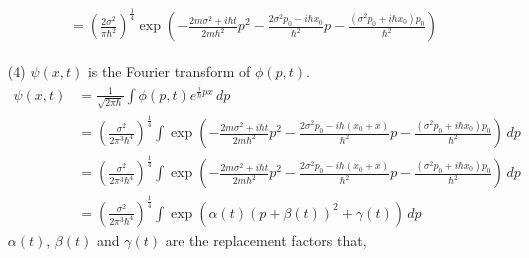 \documentclass[floatfix,nofootinbib,superscriptaddress,fleqn]{revtex4}
\begin{document}
\begin{itemize}
\begin{align*}
\begin{split}
      &={\left(\frac{2\sigma^2}{\pi\hbar^2}\right)}^{\frac{1}{4}}
      \exp\left(-\frac{2m\sigma^2+i\hbar t}{2m\hbar^2}p^2 
      -\frac{2\sigma^2p_0-i\hbar x_0}{\hbar^2}p
      -\frac{\left(\sigma^2p_0+i\hbar x_0\right)p_0}{\hbar^2} \right)
    \end{split}
  \end{align*}
  \item[(4)] $\psi(x,t)$ is the Fourier transform of $\phi(p,t)$.
  \begin{align}
    \psi(x,t) &= \frac{1}{\sqrt{2\pi\hbar}}\int\phi(p,t)e^{\frac{i}{\hbar}px}\,dp  \\
    &={\left(\frac{\sigma^2}{2\pi^3\hbar^4}\right)}^{\frac{1}{4}}
    \int\exp\left(-\frac{2m\sigma^2+i\hbar t}{2m\hbar^2} p^2 
    -\frac{2\sigma^2p_0-i\hbar (x_0+x)}{\hbar^2}p
    -\frac{\left(\sigma^2p_0+i\hbar x_0\right)p_0}{\hbar^2}\right)\,dp  \\
    &={\left(\frac{\sigma^2}{2\pi^3\hbar^4}\right)}^{\frac{1}{4}}
    \int\exp\left(-\frac{2m\sigma^2+i\hbar t}{2m\hbar^2} p^2 
    -\frac{2\sigma^2p_0-i\hbar (x_0+x)}{\hbar^2}p
    -\frac{\left(\sigma^2p_0+i\hbar x_0\right)p_0}{\hbar^2}\right)\,dp  \\
    &={\left(\frac{\sigma^2}{2\pi^3\hbar^4}\right)}^{\frac{1}{4}}
    \int\exp{\left( \alpha(t)\left(p+\beta(t)\right)^2+\gamma(t) \right)}\,dp
  \end{align}
  $\alpha(t)$, $\beta(t)$ and $\gamma(t)$ are the replacement factors that,

\end{itemize}
\end{document}
